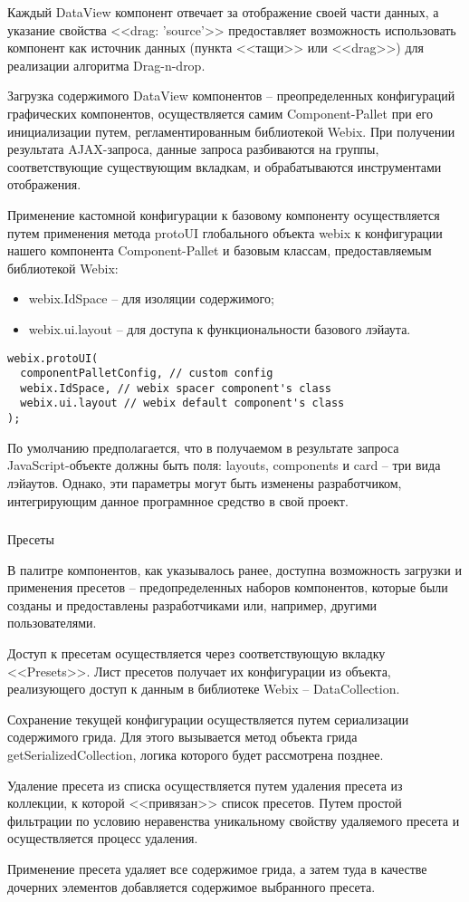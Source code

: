 Каждый DataView компонент отвечает за отображение своей части данных, а указание свойства <<drag: 'source'>> предоставляет возможность использовать компонент как источник данных (пункта <<тащи>> или <<drag>>) для реализации алгоритма Drag-n-drop.

Загрузка содержимого DataView компонентов -- преопределенных конфигураций графических компонентов, осуществляется самим Component-Pallet при его инициализации путем, регламентированным библиотекой Webix. При получении результата AJAX-запроса, данные запроса разбиваются на группы, соответствующие существующим вкладкам, и обрабатываются инструментами отображения.

Применение кастомной конфигурации к базовому компоненту осуществляется путем применения метода protoUI глобального объекта webix к конфигурации нашего компонента Component-Pallet и базовым классам, предоставляемым библиотекой Webix:
\begin{itemize}
    \item webix.IdSpace -- для изоляции содержимого;
    \item webix.ui.layout -- для доступа к функциональности базового лэйаута.
\end{itemize}

\begin{lstlisting}
webix.protoUI(
  componentPalletConfig, // custom config
  webix.IdSpace, // webix spacer component's class
  webix.ui.layout // webix default component's class
);
\end{lstlisting}

По умолчанию предполагается, что в получаемом в результате запроса JavaScript-объекте должны быть поля: layouts, components и card -- три вида лэйаутов. Однако, эти параметры могут быть изменены разработчиком, интегрирующим данное програмнное средство в свой проект.

\subsubsection{}Пресеты
\

В палитре компонентов, как указывалось ранее, доступна возможность загрузки и применения пресетов -- предопределенных наборов компонентов, которые были созданы и предоставлены разработчиками или, например, другими пользователями.

Доступ к пресетам осуществляется через соответствующую вкладку <<Presets>>. Лист пресетов получает их конфигурации из объекта, реализующего доступ к данным в библиотеке Webix -- DataCollection.

Сохранение текущей конфигурации осуществляется путем сериализации содержимого грида. Для этого вызывается метод объекта грида getSerializedCollection, логика которого будет рассмотрена позднее.

Удаление пресета из списка осуществляется путем удаления пресета из коллекции, к которой <<привязан>> список пресетов. Путем простой фильтрации по условию неравенства уникальному свойству удаляемого пресета и осуществляется процесс удаления.

Применение пресета удаляет все содержимое грида, а затем туда в качестве дочерних элементов добавляется содержимое выбранного пресета. 
